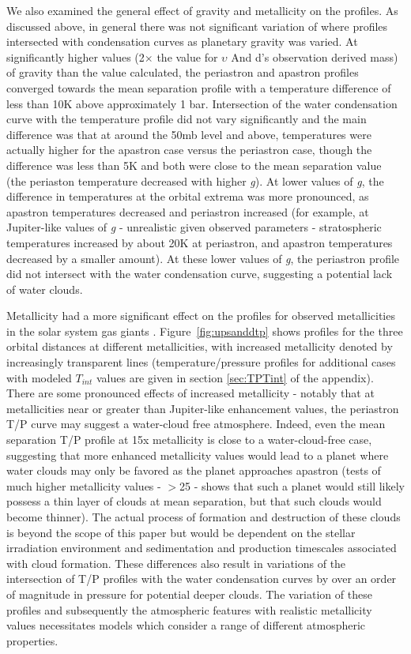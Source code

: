 \documentclass[12pt, letterpaper]{aastex631}
\begin{document}
We also examined the general effect of gravity and metallicity on the profiles.  As discussed above, in general there was not significant variation of where profiles intersected with condensation curves as planetary gravity was varied.  At significantly higher values (2$\times$ the value for $\upsilon$ And d's observation derived mass) of gravity than the value calculated, the periastron and apastron profiles converged towards the mean separation profile with a temperature difference of less than 10K above approximately 1 bar.  Intersection of the water condensation curve with the temperature profile did not vary significantly and the main difference was that at around the 50mb level and above, temperatures were actually higher for the apastron case versus the periastron case, though the difference was less than 5K and both were close to the mean separation value (the periaston temperature decreased with higher \textit{g}). At lower values of \textit{g}, the difference in temperatures at the orbital extrema was more pronounced, as apastron temperatures decreased and periastron increased (for example, at Jupiter-like values of \textit{g} - unrealistic given observed parameters - stratospheric temperatures increased by about 20K at periastron, and apastron temperatures decreased by a smaller amount).  At these lower values of \textit{g}, the periastron profile did not intersect with the water condensation curve, suggesting a potential lack of water clouds.  

Metallicity had a more significant effect on the profiles for observed metallicities in the solar system gas giants \citep{WONG2004153, 2009Icar..199..351F}. Figure~\ref{fig:upsanddtp} shows profiles for the three orbital distances at different metallicities, with increased metallicity denoted by increasingly transparent lines (temperature/pressure profiles for additional cases with modeled $T_{int}$ values are given in section \ref{sec:TPTint} of the appendix). There are some pronounced effects of increased metallicity - notably that at metallicities near or greater than Jupiter-like enhancement values, the periastron T/P curve may suggest a water-cloud free atmosphere.  Indeed, even the mean separation T/P profile at 15x metallicity is close to a water-cloud-free case, suggesting that more enhanced metallicity values would lead to a planet where water clouds may only be favored as the planet approaches apastron (tests of much higher metallicity values - $>$25 - shows that such a planet would still likely possess a thin layer of clouds at mean separation, but that such clouds would become thinner). The actual process of formation and destruction of these clouds is beyond the scope of this paper but would be dependent on the stellar irradiation environment and sedimentation and production timescales associated with cloud formation. These differences also result in variations of the intersection of T/P profiles with the water condensation curves by over an order of magnitude in pressure for potential deeper clouds.  The variation of these profiles and subsequently the atmospheric features with realistic metallicity values necessitates models which consider a range of different atmospheric properties. 
\end{document}

